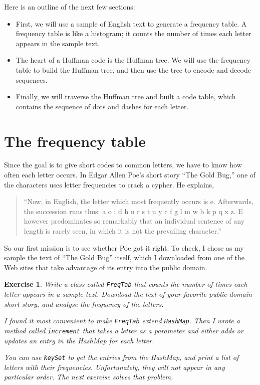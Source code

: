 \documentclass[12pt]{book}
\theoremstyle{exercise}
\newtheorem{exercise}{Exercise}[chapter]
\begin{document}
Here is an outline of the next few sections:

\begin{itemize}

\item First, we will use a sample of English text to generate
a frequency table.  A frequency table is like a histogram; it counts
the number of times each letter appears in the sample text.

\item The heart of a Huffman code is the Huffman tree.  We will
use the frequency table to build the Huffman tree, and then use
the tree to encode and decode sequences.

\item Finally, we will traverse the Huffman tree and built a code
table, which contains the sequence of dots and dashes for each letter.

\end{itemize}


\section {The frequency table}
\label{freqtab}


Since the goal is to give short codes to common letters, we have to
know how often each letter occurs.  In Edgar Allen Poe's short story
``The Gold Bug,'' one of the characters uses letter frequencies to
crack a cypher.  He explains,

\begin{quote}
``Now, in English, the letter which most frequently occurs is
e. Afterwards, the succession runs thus: a o i d h n
r s t u y c f g l m w b k p q x z.  E however
predominates so remarkably that an individual
sentence of any length is rarely seen, in which it is
not the prevailing character.''
\end{quote}

So our first mission is to see whether Poe got it right.  To check,
I chose as my sample the text of ``The Gold Bug'' itself, which
I downloaded from one of the Web sites that take advantage
of its entry into the public domain.

\begin{exercise}
Write a class called {\tt FreqTab} that counts the number of
times each letter appears in a sample text.  Download the text
of your favorite public-domain short story, and analyse the frequency
of the letters.


I found it most convenient to make {\tt FreqTab} extend
{\tt HashMap}.  Then I wrote a method called {\tt increment}
that takes a letter as a parameter and either adds or updates
an entry in the HashMap for each letter.

You can use {\tt keySet} to get the entries from the HashMap,
and print a list of letters with their frequencies.  Unfortunately,
they will not appear in any particular order.  The next exercise
solves that problem.
\end{exercise}
\end{document}
